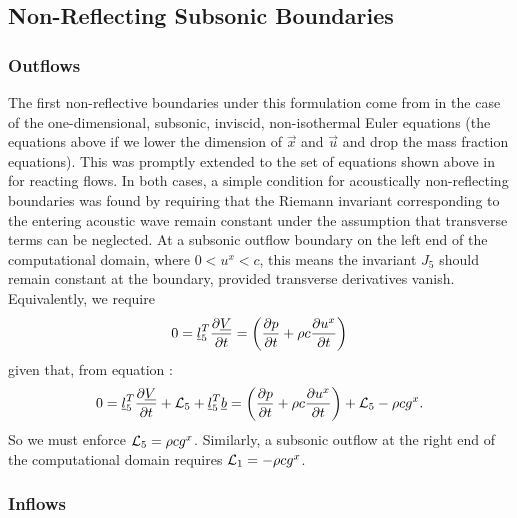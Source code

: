 \subsection{Non-Reflecting Subsonic Boundaries}

\subsubsection{Outflows}

The first non-reflective boundaries under this formulation come from \cite{thompson1987TimeDependentBoundary} in the case of the one-dimensional, subsonic, inviscid, non-isothermal Euler equations (the equations above if we lower the dimension of $\vec{x}$ and $\vec{u}$ and drop the mass fraction equations). This was promptly extended to the set of equations shown above in \cite{poinsot1992BoundaryConditionsDirect} for reacting flows. In both cases, a simple condition for acoustically non-reflecting boundaries was found by requiring that the Riemann invariant corresponding to the entering acoustic wave remain constant under the assumption that transverse terms can be neglected. At a subsonic outflow boundary on the left end of the computational domain, where $0 < u^x < c$, this means the invariant $J_5$ should remain constant at the boundary, provided transverse derivatives vanish. Equivalently, we require
\begin{equation}
0 = \underline{l}^T_5 \pdv{\underline{V}}{t} = \left( \pdv{p}{t} + \rho c \pdv{u^x}{t} \right)
\end{equation}
given that, from equation :
\begin{equation}
0 = \underline{l}^T_5 \pdv{\underline{V}}{t} + \mathcal{L}_5 + \underline{l}^T_5 \underline{b} = \left( \pdv{p}{t} + \rho c \pdv{u^x}{t} \right) + \mathcal{L}_5 - \rho c g^x.
\end{equation}
So we must enforce $\mathcal{L}_5 = \rho c g^x$. Similarly, a subsonic outflow at the right end of the computational domain requires $\mathcal{L}_1 = - \rho c g^x$.

\subsubsection{Inflows}

